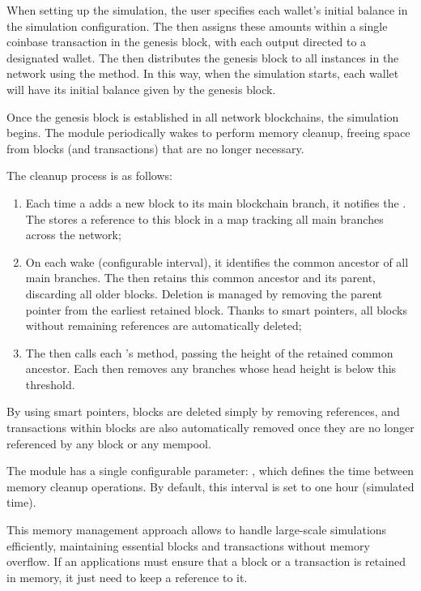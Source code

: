 When setting up the simulation, the user specifies each wallet's initial
balance in the simulation configuration. The  then assigns these
amounts within a single coinbase transaction in the genesis block, with each
output directed to a designated wallet. The  then distributes the
genesis block to all  instances in the network using
the  method. In this way, when the simulation starts,
each wallet will have its initial balance given by the genesis block.

Once the genesis block is established in all network blockchains, the
simulation begins. The  module periodically wakes to perform memory
cleanup, freeing space from blocks (and transactions) that are no longer
necessary.

The cleanup process is as follows:
\begin{enumerate}
	\item Each time a  adds a new block to its main
		blockchain branch, it notifies the . The 
		stores a reference to this block in a map tracking all main
		branches across the network;
	\item On each  wake (configurable interval), it identifies
		the common ancestor of all main branches. The  then
		retains this common ancestor and its parent, discarding all
		older blocks. Deletion is managed by removing the parent
		pointer from the earliest retained block. Thanks to smart
		pointers, all blocks without remaining references are
		automatically deleted;
	\item The  then calls each 's
		 method, passing the height of the retained
		common ancestor. Each  then removes any
		branches whose head height is below this threshold.
\end{enumerate}

By using smart pointers, blocks are deleted simply by removing references, and
transactions within blocks are also automatically removed once they are no
longer referenced by any block or any mempool.

The  module has a single configurable parameter:
, which defines the time between memory cleanup
operations. By default, this interval is set to one hour (simulated time).

This memory management approach allows \iblock{} to handle large-scale
simulations efficiently, maintaining essential blocks and transactions without
memory overflow. If an applications must ensure that a block or a transaction
is retained in memory, it just need to keep a reference to it.
